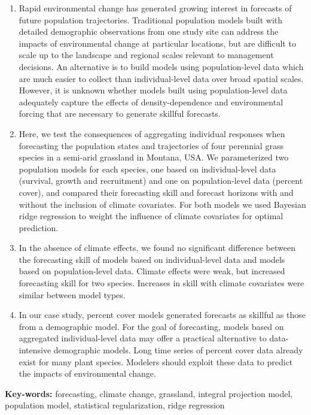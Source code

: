 \documentclass[12pt,]{article}
\begin{document}
\begin{enumerate}[label=\textbf{\arabic*}]
        \item Rapid environmental change has generated growing interest in forecasts of future population trajectories. Traditional population models built with detailed demographic observations from one study site can address the impacts of environmental change at particular locations, but are difficult to scale up to the landscape and regional scales relevant to management decisions. An alternative is to build models using population-level data which are much easier to collect than individual-level data over broad spatial scales. However, it is unknown whether models built using population-level data adequately capture the effects of density-dependence and environmental forcing that are necessary to generate skillful forecasts.
        \item Here, we test the consequences of aggregating individual responses when forecasting the population states and trajectories of four perennial grass species in a semi-arid grassland in Montana, USA. We parameterized two population models for each species, one based on individual-level data (survival, growth and recruitment) and one on population-level data (percent cover), and compared their forecasting skill and forecast horizons with and without the inclusion of climate covariates. For both models we used Bayesian ridge regression to weight the influence of climate covariates for optimal prediction. 
        \item In the absence of climate effects, we found no significant difference between the forecasting skill of models based on individual-level data and models based on population-level data. Climate effects were weak, but increased forecasting skill for two species. Increases in skill with climate covariates were similar between model types.
        \item In our case study, percent cover models generated forecasts as skillful as those from a demographic model. For the goal of forecasting, models based on aggregated individual-level data may offer a practical alternative to data-intensive demographic models. Long time series of percent cover data already exist for many plant species. Modelers should exploit these data to predict the impacts of environmental change.
    \end{enumerate}

\textsf{\textbf{Key-words:}} forecasting, climate change, grassland,
integral projection model, population model, statistical regularization,
ridge regression
\end{document}
